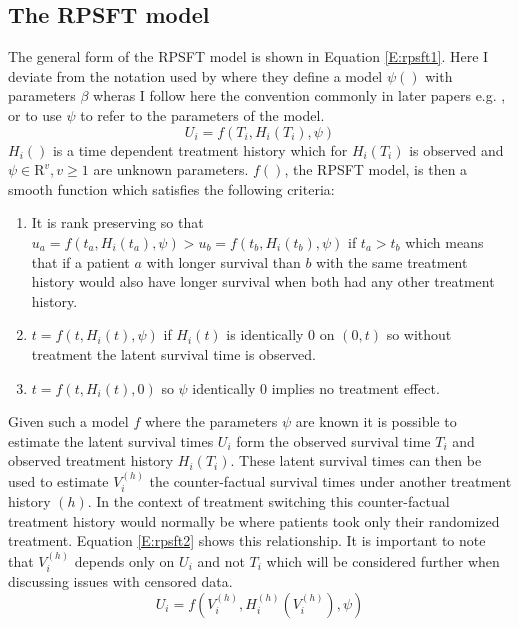 \subsection{The RPSFT model}
The general form of the RPSFT model is shown in Equation \ref{E:rpsft1}. Here I deviate from the notation used by \cite{Robins1991} where they define a model $\psi()$ with parameters $\beta$ wheras I follow here the convention commonly in later papers e.g. \cite{White1999}, \cite{Morden2011} or \cite{Watkins2013} to use $\psi$ to refer to the parameters of the model.  
\begin{equation}
\label{E:rpsft1}
U_i = f\left(T_i, H_i(T_i), \psi \right)
\end{equation}
$H_i()$ is a time dependent treatment history which for $H_i(T_i)$ is observed and $\psi \in \mathrm{R}^v, v \geq 1$ are unknown parameters. $f()$, the RPSFT model, is then a smooth function which satisfies the following criteria:
\begin{enumerate}
\item It is rank preserving so that $u_a = f(t_a,H_i(t_a),\psi) > u_b = f(t_b,H_i(t_b),\psi)$ if $t_a>t_b$ which means that if a patient $a$ with longer survival than $b$ with the same treatment history would also have longer survival when both had any other treatment history.
\item $t=f(t,H_i(t),\psi)$ if $H_i(t)$ is identically 0 on $(0,t)$ so without treatment the latent survival time is observed.
\item $t=f(t,H_i(t),0)$ so $\psi$ identically 0 implies no treatment effect.
\end{enumerate}
Given such a model $f$ where the parameters $\psi$ are known it is possible to estimate the latent survival times $U_i$ form the observed survival time $T_i$ and observed treatment history $H_i(T_i)$. These latent survival times can then be used to estimate $V_i^{(h)}$ the counter-factual survival times under another treatment history $(h)$. In the context of treatment switching this counter-factual treatment history would normally be where patients took only their randomized treatment. Equation \ref{E:rpsft2} shows this relationship. It is important to note that $V_i^{(h)}$ depends only on $U_i$ and not $T_i$ which will be considered further when discussing issues with censored data.
\begin{equation}
\label{E:rpsft2}
U_i = f\left(V_i^{(h)}, H^{(h)}_i(V_i^{(h)}),\psi\right)
\end{equation}

